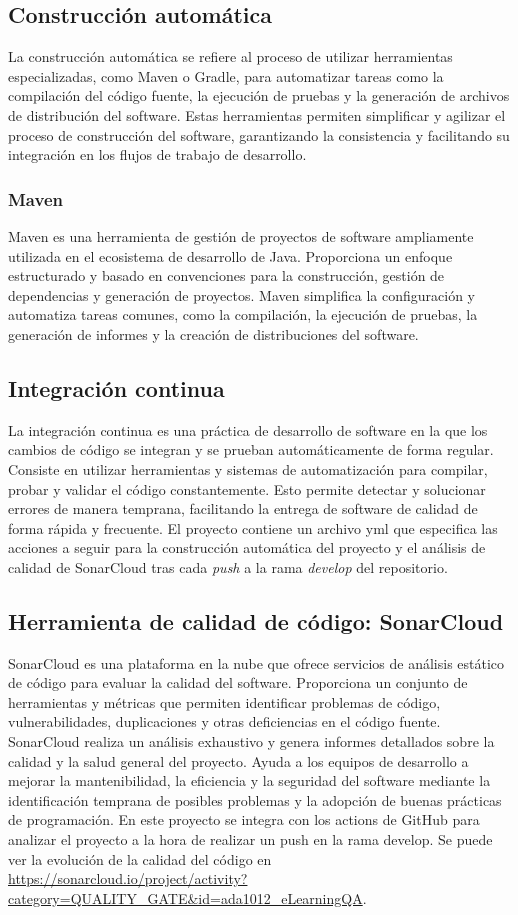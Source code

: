 \subsection{Construcción automática}
La construcción automática se refiere al proceso de utilizar herramientas especializadas, como Maven o Gradle, para automatizar tareas como la compilación del código fuente, la ejecución de pruebas y la generación de archivos de distribución del software. Estas herramientas permiten simplificar y agilizar el proceso de construcción del software, garantizando la consistencia y facilitando su integración en los flujos de trabajo de desarrollo.
\subsubsection{Maven}
Maven es una herramienta de gestión de proyectos de software ampliamente utilizada en el ecosistema de desarrollo de Java. Proporciona un enfoque estructurado y basado en convenciones para la construcción, gestión de dependencias y generación de proyectos. Maven simplifica la configuración y automatiza tareas comunes, como la compilación, la ejecución de pruebas, la generación de informes y la creación de distribuciones del software.
\subsection{Integración continua}
La integración continua es una práctica de desarrollo de software en la que los cambios de código se integran y se prueban automáticamente de forma regular. Consiste en utilizar herramientas y sistemas de automatización para compilar, probar y validar el código constantemente. Esto permite detectar y solucionar errores de manera temprana, facilitando la entrega de software de calidad de forma rápida y frecuente. 
El proyecto contiene un archivo yml que especifica las acciones a seguir para la construcción automática del proyecto y el análisis de calidad de SonarCloud tras cada \textit{push} a la rama \textit{develop} del repositorio.
\subsection{Herramienta de calidad de código: SonarCloud}
SonarCloud es una plataforma en la nube que ofrece servicios de análisis estático de código para evaluar la calidad del software. Proporciona un conjunto de herramientas y métricas que permiten identificar problemas de código, vulnerabilidades, duplicaciones y otras deficiencias en el código fuente. SonarCloud realiza un análisis exhaustivo y genera informes detallados sobre la calidad y la salud general del proyecto. Ayuda a los equipos de desarrollo a mejorar la mantenibilidad, la eficiencia y la seguridad del software mediante la identificación temprana de posibles problemas y la adopción de buenas prácticas de programación.
En este proyecto se integra con los actions de GitHub para analizar el proyecto a la hora de realizar un push en la rama develop.
Se puede ver la evolución de la calidad del código en \url{https://sonarcloud.io/project/activity?category=QUALITY_GATE&id=ada1012_eLearningQA}.

